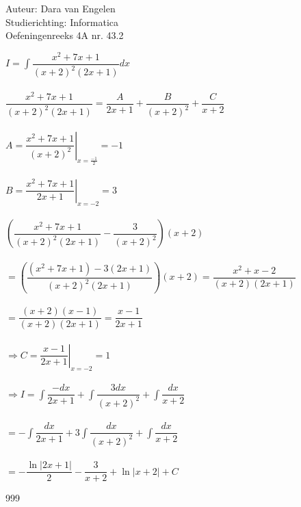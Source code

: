 \documentclass[a4paper]{article}
\begin{document}
  
\noindent \large Auteur: Dara van Engelen \\
\noindent \large Studierichting: Informatica\\
\noindent \large Oefeningenreeks 4A nr. 43.2\\

\medskip

\normalsize

$ I = \displaystyle\int \dfrac{x^2+7x+1}{(x+2)^2(2x+1)}dx$\\\\

$\dfrac{x^2+7x+1}{(x+2)^2(2x+1)} = \dfrac{A}{2x+1} + \dfrac{B}{(x+2)^2} + \dfrac{C}{x+2}$\\\\

$A  =\left. \dfrac{x^2+7x+1}{(x+2)^2} \right|_{x=\tfrac{-1}{2}} = -1$\\\\

$B  =\left. \dfrac{x^2+7x+1}{2x+1} \right|_{x=-2}= 3$\\\\

$ \left( \dfrac{x^2+7x+1}{(x+2)^2(2x+1)} - \dfrac{3}{(x+2)^2}\right)(x+2)$\\\\

$ = \left( \dfrac{(x^2+7x+1)-3(2x+1)}{(x+2)^2(2x+1)} \right)(x+2) = \dfrac{x^2+x-2}{(x+2)(2x+1)} $\\\\

$= \dfrac{(x+2)(x-1)}{(x+2)(2x+1)} = \dfrac{x-1}{2x+1}$\\\\

$\Rightarrow C = \left. \dfrac{x-1}{2x+1} \right|_{x=-2} = 1$\\\\

$\Rightarrow I = \displaystyle\int \dfrac{-dx}{2x+1} + \displaystyle\int \dfrac{3dx}{(x+2)^2} + \displaystyle\int \dfrac{dx}{x+2}$\\\\

$ = -\displaystyle\int \dfrac{dx}{2x+1} + 3\displaystyle\int \dfrac{dx}{(x+2)^2} + \displaystyle\int \dfrac{dx}{x+2}$\\\\

$ = -\dfrac{\ln|2x+1|}{2} - \dfrac{3}{x+2} + \ln|x+2| + C$

\begin{thebibliography}{999}
\end{thebibliography}
\end{document}
